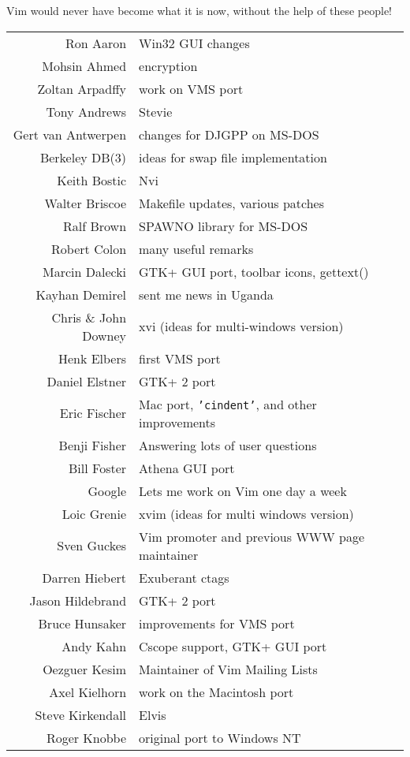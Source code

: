 Vim would never have become what it is now, without the help of these people!
\begin{longtable}{r l}
				Ron Aaron & Win32 GUI changes\\
				Mohsin Ahmed & encryption\\
				Zoltan Arpadffy & work on VMS port\\
				Tony Andrews & Stevie\\
				Gert van Antwerpen & changes for DJGPP on MS-DOS\\
				Berkeley DB(3) & ideas for swap file implementation\\
				Keith Bostic & Nvi\\
				Walter Briscoe & Makefile updates, various patches\\
				Ralf Brown & SPAWNO library for MS-DOS\\
				Robert Colon & many useful remarks\\
				Marcin Dalecki & GTK+ GUI port, toolbar icons, gettext()\\
				Kayhan Demirel & sent me news in Uganda\\
				Chris \& John Downey & xvi (ideas for multi-windows version)\\
				Henk Elbers & first VMS port\\
				Daniel Elstner & GTK+ 2 port\\
				Eric Fischer & Mac port, \texttt{'cindent'}, and other improvements\\
				Benji Fisher & Answering lots of user questions\\
				Bill Foster & Athena GUI port\\
				Google & Lets me work on Vim one day a week\\
				Loic Grenie & xvim (ideas for multi windows version)\\
				Sven Guckes & Vim promoter and previous WWW page maintainer\\
				Darren Hiebert & Exuberant ctags\\
				Jason Hildebrand & GTK+ 2 port\\
				Bruce Hunsaker & improvements for VMS port\\
				Andy Kahn & Cscope support, GTK+ GUI port\\
				Oezguer Kesim & Maintainer of Vim Mailing Lists\\
				Axel Kielhorn & work on the Macintosh port\\
				Steve Kirkendall & Elvis\\
				Roger Knobbe & original port to Windows NT\\

\end{longtable}

